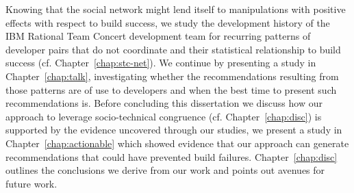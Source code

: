 Knowing that the social network might lend itself to manipulations with positive effects with respect to build success, we study the development history of the IBM Rational Team Concert development team for recurring patterns of developer pairs that do not coordinate and their statistical relationship to build success (cf. Chapter~\ref{chap:stc-net}).
We continue by presenting a study in Chapter~\ref{chap:talk}, investigating whether the recommendations resulting from those patterns are of use to developers and when the best time to present such recommendations is.
Before concluding this dissertation we discuss how our approach to leverage socio-technical congruence (cf. Chapter~\ref{chap:disc}) is supported by the evidence uncovered through our studies, we present a study in Chapter~\ref{chap:actionable} which showed evidence that our approach can generate recommendations that could have prevented build failures.
Chapter~\ref{chap:disc} outlines the conclusions we derive from our work and points out avenues for future work.




















